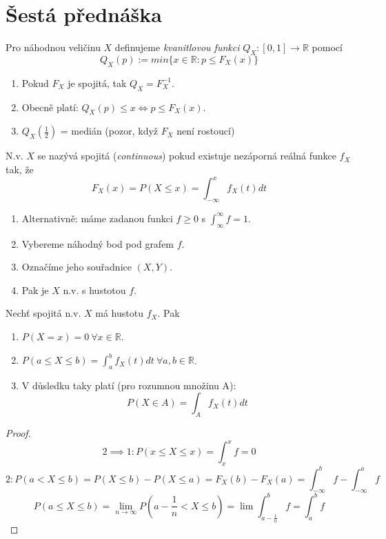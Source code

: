 \documentclass[../main.tex]{subfiles}
\begin{document}
\section{Šestá přednáška}

\begin{definition}
    Pro náhodnou veličinu $X$ definujeme \textit{kvanitlovou funkci} 
    $Q_X : [0,1] \rightarrow \mathbb{R}$ pomocí
    \[Q_X(p) := min \{x \in \mathbb{R} : p \leq F_X(x)\}\]
    \begin{enumerate}
        \item Pokud $F_X$ je spojitá, tak $Q_X = F^{-1}_X.$
        \item Obecně platí: $Q_X(p) \leq x \Leftrightarrow p \leq F_X(x)$.
        \item $Q_X(\frac{1}{2})$ = medián (pozor, když  $F_X$ není rostoucí)
    \end{enumerate}
\end{definition}

\begin{definition}
    N.v. $X$ se nazývá spojitá (\textit{continuous}) pokud existuje nezáporná reálná funkce $f_X$ tak, že
    \[F_X(x) = P(X \leq x) = \int^x_{-\infty} f_X(t)dt\]
    \begin{enumerate}
        \item Alternativně: máme zadanou funkci $f \geq 0$ s $\int^\infty_\infty f = 1$.
        \item Vybereme náhodný bod pod grafem $f$.
        \item Označíme jeho souřadnice $(X,Y)$.
        \item Pak je $X$ n.v. s hustotou $f$.
    \end{enumerate}
\end{definition}

\begin{theorem}
    Nechť spojitá n.v. $X$ má hustotu $f_X$. Pak
    \begin{enumerate}
        \item $P(X=x) = 0\ \forall x \in \mathbb{R}$.
        \item $P(a\leq X \leq b) = \int^b_a f_X(t) dt\ \forall a,b \in \mathbb{R}$.
        \item V důsledku taky platí (pro rozumnou množinu A):
            \[P(X\in A) = \int_A f_X(t) dt\]
    \end{enumerate} 
\end{theorem}
\begin{proof}
    \[2 \implies 1 : P(x\leq X\leq x) = \int^x_x f = 0\]
    \[2 :  P(a < X \leq b) = P(X\leq b) - P(X\leq a) = F_X(b) - F_X(a) = \int^b_{-\infty} f - \int^a_{-\infty} f\]
    \[P(a\leq X \leq b) = \lim_{n\rightarrow \infty} P(a-\frac{1}{n} < X \leq b) = \lim \int^b_{a-\frac{1}{n}} f = \int^b_a f\]
\end{proof}
\end{document}
